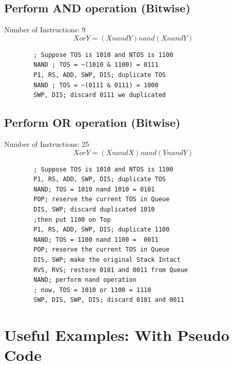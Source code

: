 \documentclass[11pt]{report}
\begin{document}
    \subsection{Perform AND operation (Bitwise)}
    Number of Instructions: 9
    $$X or Y = (XnandY)nand(XnandY)$$
    \begin{verbatim}
        ; Suppose TOS is 1010 and NTOS is 1100
        NAND ; TOS = ~(1010 & 1100) = 0111
        P1, RS, ADD, SWP, DIS; duplicate TOS 
        NAND ; TOS = ~(0111 & 0111) = 1000
        SWP, DIS; discard 0111 we duplicated
    \end{verbatim}

    \subsection{Perform OR operation (Bitwise)}
    Number of Instructions: 25
    $$XorY = (XnandX)nand(YnandY)$$
    \begin{verbatim}
        ; Suppose TOS is 1010 and NTOS is 1100
        P1, RS, ADD, SWP, DIS; duplicate TOS 
        NAND; TOS = 1010 nand 1010 = 0101
        POP; reserve the current TOS in Queue
        DIS, SWP; discard duplicated 1010
        ;then put 1100 on Top
        P1, RS, ADD, SWP, DIS; duplicate 1100
        NAND; TOS = 1100 nand 1100 =  0011
        POP; reserve the current TOS in Queue
        DIS, SWP; make the original Stack Intact
        RVS, RVS; restore 0101 and 0011 from Queue
        NAND; perform nand operation
        ; now, TOS = 1010 or 1100 = 1110
        SWP, DIS, SWP, DIS; discard 0101 and 0011
    \end{verbatim}

    \section{Useful Examples: With Pseudo Code}
\end{document}

